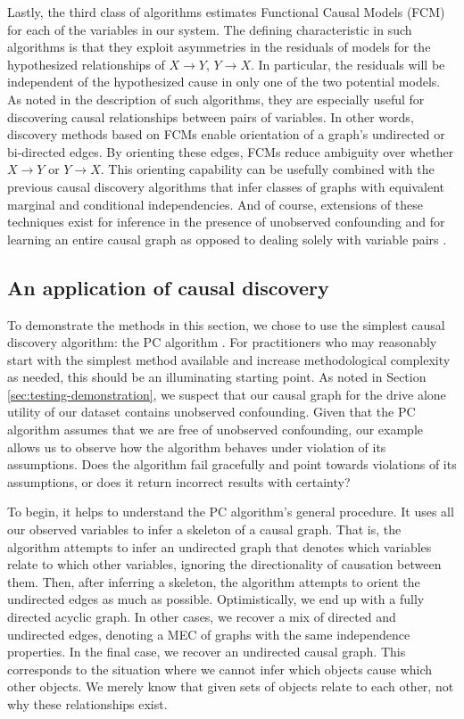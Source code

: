 Lastly, the third class of algorithms estimates Functional Causal Models (FCM) \citep{goudet_2018_learning} for each of the variables in our system.
The defining characteristic in such algorithms is that they exploit asymmetries in the residuals of models for the hypothesized relationships of $X \rightarrow Y$, $Y \rightarrow X$.
In particular, the residuals will be independent of the hypothesized cause in only one of the two potential models.
As noted in the description of such algorithms, they are especially useful for discovering causal relationships between pairs of variables.
In other words, discovery methods based on FCMs enable orientation of a graph's undirected or bi-directed edges.
By orienting these edges, FCMs reduce ambiguity over whether $X \rightarrow Y$ or $Y \rightarrow X$.
This orienting capability can be usefully combined with the previous causal discovery algorithms that infer classes of graphs with equivalent marginal and conditional independencies.
And of course, extensions of these techniques exist for inference in the presence of unobserved confounding \citep[Sec. 6]{goudet_2018_learning} and for learning an entire causal graph as opposed to dealing solely with variable pairs \citep{zheng_2020_learning}.

\subsection{An application of causal discovery}
\label{sec:discovery-application}
To demonstrate the methods in this section, we chose to use the simplest causal discovery algorithm: the PC algorithm \citep{glymour_2001_causation}.
For practitioners who may reasonably start with the simplest method available and increase methodological complexity as needed, this should be an illuminating starting point.
As noted in Section \ref{sec:testing-demonstration}, we suspect that our causal graph for the drive alone utility of our dataset contains unobserved confounding.
Given that the PC algorithm assumes that we are free of unobserved confounding, our example allows us to observe how the algorithm behaves under violation of its assumptions.
Does the algorithm fail gracefully and point towards violations of its assumptions, or does it return incorrect results with certainty?

To begin, it helps to understand the PC algorithm's general procedure.
It uses all our observed variables to infer a skeleton of a causal graph.
That is, the algorithm attempts to infer an undirected graph that denotes which variables relate to which other variables, ignoring the directionality of causation between them.
Then, after inferring a skeleton, the algorithm attempts to orient the undirected edges as much as possible.
Optimistically, we end up with a fully directed acyclic graph.
In other cases, we recover a mix of directed and undirected edges, denoting a MEC of graphs with the same independence properties.
In the final case, we recover an undirected causal graph.
This corresponds to the situation where we cannot infer which objects cause which other objects.
We merely know that given sets of objects relate to each other, not why these relationships exist.

